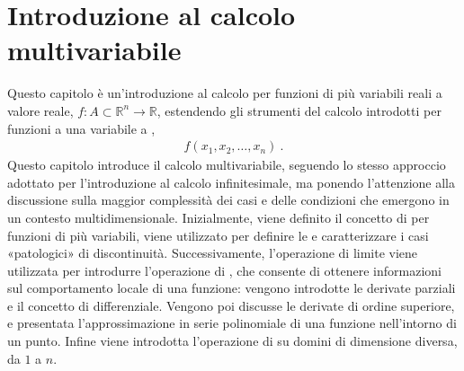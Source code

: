 \documentclass[letterpaper,10pt,italian]{jupyterBook}
\begin{document}
\chapter{Introduzione al calcolo multi\sphinxhyphen{}variabile}
\label{\detokenize{ch/multivariable-calculus:introduzione-al-calcolo-multi-variabile}}\label{\detokenize{ch/multivariable-calculus:multivariable-calculus-intro}}\label{\detokenize{ch/multivariable-calculus::doc}}
\sphinxAtStartPar
Questo capitolo è un’introduzione al calcolo per funzioni di più variabili reali a valore reale, \(f: A \subset \mathbb{R}^n \rightarrow \mathbb{R}\), estendendo gli strumenti del calcolo introdotti per funzioni a una variabile a {\hyperref[\detokenize{ch/precalculus/multivariable-real-fun:math-hs-precalculus-multivariable-real-fun}]{}},
\begin{equation*}
\begin{split}f(x_1, x_2, \dots, x_n) \ .\end{split}
\end{equation*}
\sphinxAtStartPar
{} Questo capitolo introduce il calcolo multivariabile, seguendo lo stesso approccio adottato per l’introduzione al calcolo infinitesimale, ma ponendo l’attenzione alla discussione sulla maggior complessità dei casi e delle condizioni che emergono in un contesto multidimensionale.
Inizialmente, viene definito il concetto di {\hyperref[\detokenize{ch/multivariable-calculus/limits:multivariable-calculus-limit}]{}} per funzioni di più variabili, viene utilizzato per definire le {\hyperref[\detokenize{ch/multivariable-calculus/limits:multivariable-calculus-continuity}]{}} e caratterizzare i casi «patologici» di discontinuità.
Successivamente, l’operazione di limite viene utilizzata per introdurre l’operazione di {\hyperref[\detokenize{ch/multivariable-calculus/derivatives:multivariable-calculus-derivatives}]{}}, che consente di ottenere informazioni sul comportamento locale di una funzione: vengono introdotte le derivate parziali e il concetto di differenziale. Vengono poi discusse le derivate di ordine superiore, e presentata l’approssimazione in serie polinomiale di una funzione nell’intorno di un punto.
Infine viene introdotta l’operazione di {\hyperref[\detokenize{ch/multivariable-calculus/integrals:multivariable-calculus-integrals}]{}} su domini di dimensione diversa, da \(1\) a \(n\).
\end{document}
